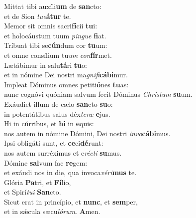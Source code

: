 \evenverse Mittat tibi auxíli\textbf{um} de \textbf{san}cto:~\*\\
\evenverse et de Sion \textit{tu}\textit{e}\textbf{á}\textbf{tur} te.\\
\oddverse Memor sit omnis sacri\textbf{fí}cii \textbf{tu}i:~\*\\
\oddverse et holocáustum tuum \textit{pin}\textit{gue} \textbf{fi}at.\\
\evenverse Tríbuat tibi se\textbf{cún}dum cor \textbf{tu}um:~\*\\
\evenverse et omne consílium tu\textit{um} \textit{con}\textbf{fír}met.\\
\oddverse Lætábimur in salu\textbf{tá}ri \textbf{tu}o:~\*\\
\oddverse et in nómine Dei nostri ma\textit{gni}\textit{fi}\textbf{cá}\textbf{bi}mur.\\
\evenverse Impleat Dóminus omnes petiti\textbf{ó}nes \textbf{tu}as:~\*\\
\evenverse nunc cognóvi quóniam salvum fecit Dóminus \textit{Chri}\textit{stum} \textbf{su}um.\\
\oddverse Exáudiet illum de cælo \textbf{san}cto \textbf{su}o:~\*\\
\oddverse in potentátibus salus déx\textit{te}\textit{ræ} \textbf{e}jus.\\
\evenverse Hi in cúrribus, et \textbf{hi} in \textbf{e}quis:~\*\\
\evenverse nos autem in nómine Dómini, Dei nostri \textit{in}\textit{vo}\textbf{cá}\textbf{bi}mus.\\
\oddverse Ipsi obligáti sunt, et \textbf{ce}ci\textbf{dé}runt:~\*\\
\oddverse nos autem surréximus et e\textit{ré}\textit{cti} \textbf{su}mus.\\
\evenverse Dómine \textbf{sal}vum fac \textbf{re}gem:~\*\\
\evenverse et exáudi nos in die, qua invoca\textit{vé}\textit{ri}\textbf{mus} te.\\
\oddverse Glória \textbf{Pa}tri, et \textbf{Fí}lio,~\*\\
\oddverse et Spirí\textit{tu}\textit{i} \textbf{San}cto.\\
\evenverse Sicut erat in princípio, et \textbf{nunc}, et \textbf{sem}per,~\*\\
\evenverse et in sǽcula sæcu\textit{ló}\textit{rum}. \textbf{A}men.\\
